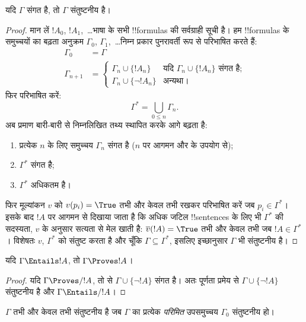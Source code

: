 \documentclass[../../../include/open-logic-section]{subfiles}
\begin{document}
\begin{thm}[पूर्णता]
यदि $\Gamma$ संगत है, तो $\Gamma$ संतुष्टनीय है।
\end{thm}

\begin{proof}
मान लें $!A_0$, $!A_1$,~\dots भाषा के सभी !!{formula}s की सर्वग्राही सूची
है। हम !!{formula}s के समुच्चयों का बढ़ता अनुक्रम $\Gamma_0$,
$\Gamma_1$,~\dots निम्न प्रकार पुनरावर्ती रूप से परिभाषित करते हैं:
\begin{align*}
\Gamma_0 & = \Gamma\\
\Gamma_{n+1} &  =
\begin{cases}
  \Gamma_n \cup \{!A_n\} & \text{यदि $\Gamma_n \cup \{!A_n\}$ संगत है;}\\
  \Gamma_n \cup \{\lnot !A_n\} & \text{अन्यथा।}
\end{cases}
\end{align*}
फिर परिभाषित करें:
\[
\Gamma^* = \bigcup_{0\le n}\Gamma_n.
\]
अब प्रमाण बारी-बारी से निम्नलिखित तथ्य स्थापित करके आगे बढ़ता है:
\begin{enumerate}
\item प्रत्येक $n$ के लिए समुच्चय $\Gamma_n$ संगत है ($n$ पर आगमन और
   के उपयोग से);
\item $\Gamma^*$ संगत है;
\item $\Gamma^*$ अधिकतम है।
\end{enumerate}
फिर मूल्यांकन $v$ को $v(p_i) = \True$ तभी और केवल तभी रखकर परिभाषित करें जब
$p_i \in \Gamma^*$। इसके बाद $!A$ पर आगमन से दिखाया जाता है कि अधिक जटिल
!!{sentence}s के लिए भी $\Gamma^*$ की सदस्यता, $v$ के अनुसार सत्यता से मेल
खाती है: $\overline{v}(!A) = \True$ तभी और केवल तभी जब $!A \in \Gamma^*$।
विशेषतः $v$, $\Gamma^*$ को संतुष्ट करता है और चूँकि $\Gamma \subseteq
\Gamma^*$, इसलिए इच्छानुसार $\Gamma$ भी संतुष्टनीय है।
\end{proof}

\begin{cor}
यदि $\Gamma \Entails !A$, तो $\Gamma \Proves !A$।
\end{cor}

\begin{proof}
यदि $\Gamma\Proves/ !A$, तो  से $\Gamma \cup
\{\lnot !A\}$ संगत है। अतः पूर्णता प्रमेय से $\Gamma \cup \{\lnot !A\}$
संतुष्टनीय है और $\Gamma \Entails/ !A$।
\end{proof}

\begin{prop}[संहतता प्रमेय]
$\Gamma$ तभी और केवल तभी संतुष्टनीय है जब $\Gamma$ का प्रत्येक \emph{परिमित}
उपसमुच्चय $\Gamma_0$ संतुष्टनीय हो।
\end{prop}
\end{document}
